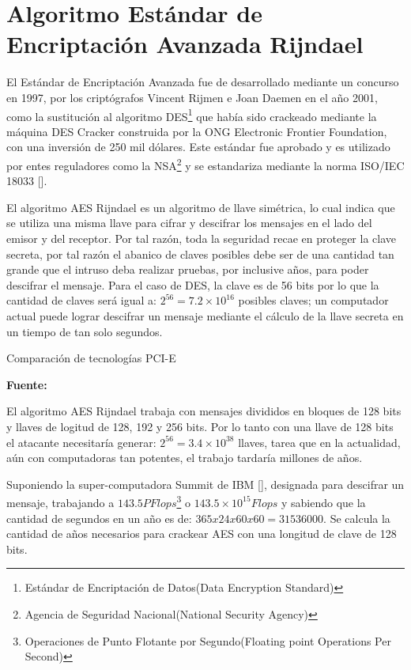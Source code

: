 \documentclass[../main/main.tex]{subfiles}
\begin{document}
  \section{Algoritmo Estándar de Encriptación Avanzada Rijndael}

  El Estándar de Encriptación Avanzada fue de desarrollado mediante un concurso en 1997, por los criptógrafos Vincent Rijmen e Joan Daemen en el año 2001, como la sustitución al algoritmo DES\footnote{Estándar de Encriptación de Datos(Data Encryption Standard)} que había sido crackeado mediante la máquina DES Cracker construida por la ONG Electronic Frontier Foundation, con una inversión de 250 mil dólares. Este estándar fue aprobado y es utilizado por entes reguladores como la NSA\footnote{Agencia de Seguridad Nacional(National Security Agency)} y se estandariza mediante la norma ISO/IEC 18033 [\cite{standard:iso_18033}].

  El algoritmo AES Rijndael es un algoritmo de llave simétrica, lo cual indica que se utiliza una misma llave para cifrar y descifrar los mensajes en el lado del emisor y del receptor. Por tal razón, toda la seguridad recae en proteger la clave secreta, por tal razón el abanico de claves posibles debe ser de una cantidad tan grande que el intruso deba realizar pruebas, por inclusive años, para poder descifrar el mensaje. Para el caso de DES, la clave es de 56 bits por lo que la cantidad de claves será igual a: $2^{56} = 7.2 \times 10^{16}$ posibles claves; un computador actual puede lograr descifrar un mensaje mediante el cálculo de la llave secreta en un tiempo de tan solo segundos.

  \begin{table}[H]
    \centering
    \caption{Comparación de tecnologías PCI-E}
    
    \caption*{\textbf{Fuente:} \cite{web:tiempo_crack_aes}}
  \end{table}

  El algoritmo AES Rijndael trabaja con mensajes divididos en bloques de 128 bits y llaves de logitud de 128, 192 y 256 bits. Por lo tanto con una llave de 128 bits el atacante necesitaría generar: $2^{56} = 3.4 \times 10^{38}$ llaves, tarea que en la actualidad, aún con computadoras tan potentes, el trabajo tardaría millones de años.

  Suponiendo la super-computadora Summit de IBM [\cite{web:supercomputadora_summit_ibm}], designada para descifrar un mensaje, trabajando a $143.5PFlops$\footnote{Operaciones de Punto Flotante por Segundo(Floating point Operations Per Second)} o $143.5 \times 10^{15} Flops$ y sabiendo que la cantidad de segundos en un año es de: $365 x 24 x 60 x 60 = 31536000$. Se calcula la cantidad de años necesarios para crackear AES con una longitud de clave de 128 bits.
\end{document}
